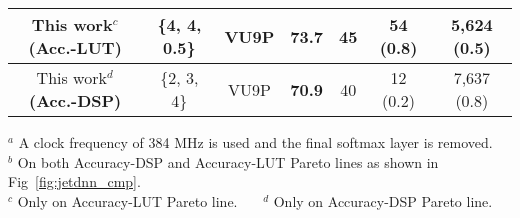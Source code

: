 \begin{table}[t]
{\begin{threeparttable}
\begin{tabular}{c| c | c |c |c | c |c }
This work$^c$ \textbf{(Acc.-LUT)} 
& \{4, 4, 0.5\} & VU9P & \textbf{73.7} & 45 
& 54 (0.8)
& 5,624 (0.5)
 \\

\midrule

This work$^d$ \textbf{(Acc.-DSP)} 
& \{2, 3, 4\} & VU9P & \textbf{70.9} & 40 
& 12 (0.2)
& 7,637 (0.8)
 \\

\bottomrule
\end{tabular}

    \footnotesize
     $^a$ A clock frequency of 384 MHz is used and the final softmax layer is removed. \\
     $^b$ On both Accuracy-DSP and Accuracy-LUT Pareto lines as shown in Fig~\ref{fig:jetdnn_cmp}. \\
     $^c$ Only on Accuracy-LUT Pareto line. \ \ \ $^d$ Only on Accuracy-DSP Pareto line. 
    \normalsize
\end{threeparttable}}
\end{table}